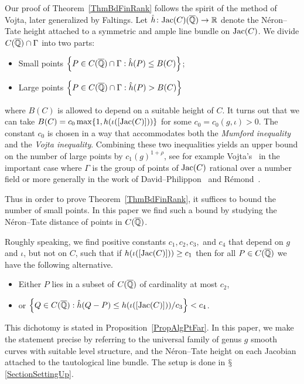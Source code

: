 Our proof of Theorem~\ref{ThmBdFinRank} follows the spirit of the
method of Vojta, later generalized by  Faltings.
Let $\hat h\colon \mathrm{Jac}(C)({\overline{\mathbb{Q}}})\rightarrow {\mathbb{R}}$ denote the
N\'eron--Tate height attached to a symmetric and ample line bundle on $\mathrm{Jac}(C)$. 
We divide $C(\overline {{\mathbb{Q}}}) \cap \Gamma$ into two parts:
\begin{itemize}
\item Small points $\left\{P \in C(\overline {{\mathbb{Q}}}) \cap \Gamma
: \hat{h}(P) \le B(C)  \right\}$;
\item Large points $\left\{P \in C(\overline {{\mathbb{Q}}}) \cap \Gamma : \hat{h}(P) > B(C) \right\}$
\end{itemize}
where $B(C)$ is allowed to depend on a suitable height of $C$. It
turns out that
we can take $B(C)=c_0 \max\{1,h(\iota([\mathrm{Jac}(C)]))\}$
for some $c_0 = c_0(g,\iota) > 0$. The constant $c_0$ is chosen in a
way that accommodates  both the \textit{Mumford inequality} and
the \textit{Vojta inequality}. Combining these
two inequalities yields an upper bound on the number of large points
by $c_1(g)^{1+\rho}$, see for example Vojta's~\cite[Theorem
6.1]{Vojta:siegelcompact} in the important case where $\Gamma$ is the
group of points of $\mathrm{Jac}(C)$ rational over
 a number field or more generally in the work of
 David--Philippon~\cite{DPvarabII,DaPh:07} and R\'emond~\cite{Remond:Decompte}.



Thus in order to prove Theorem~\ref{ThmBdFinRank}, it suffices to bound the number of small points.
In this paper we find such a  bound by studying the
N\'{e}ron--Tate distance of points in $C(\overline {{\mathbb{Q}}})$.

Roughly speaking,
we find positive constants $c_1,c_2,c_3,$ and $c_4$  that depend on
$g$ and $\iota$, but not 
on $C$, such that  if $h(\iota([\mathrm{Jac}(C)]))\ge
c_1$ then for all $P\in C({\overline{\mathbb{Q}}})$ we have the following  alternative.
\begin{itemize}
\label{eq:alternative}
\item Either $P$ lies in  a subset of $C(\overline {{\mathbb{Q}}})$ of cardinality at most $c_2$,
\item or $\left\{Q \in C(\overline {{\mathbb{Q}}}) : \hat{h}(Q-P) \le h(\iota([\mathrm{Jac}(C)]))/c_3 \right\} < c_4$.
\end{itemize}


This dichotomy is stated in Proposition~\ref{PropAlgPtFar}.
In this paper, we make the statement precise by referring to the universal family of genus $g$ smooth curves with suitable level structure, and the N\'eron--Tate height on each Jacobian attached to the tautological line bundle. 
The setup is done in $\mathsection$\ref{SectionSettingUp}.


